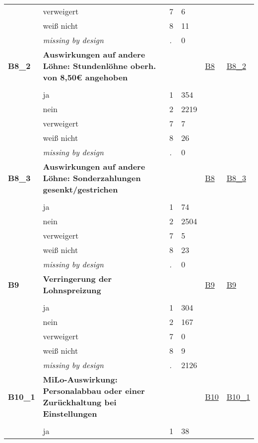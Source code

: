 \begin{longtable}{| L{2.45cm} | L{6cm} | C{1.5cm} | R{1cm} | C{2.25cm} | C{2.25cm} |}
   & verweigert & 7 & 6 &  &  \\ 
   & weiß nicht & 8 & 11 &  &  \\ 
   & \textit{missing by design} & \textit{.} & 0 &  &  \\ 
   \midrule
\textbf{B8\_2}\label{var:B8:2} & \textbf{Auswirkungen auf andere Löhne: Stundenlöhne oberh. von 8,50€ angehoben} &  &  & \hyperref[B8]{B8} & \hyperref[var:suf:B8:2]{B8\_2} \\ 
   &  &  &  &  &  \\ 
   & ja & 1 & 354 &  &  \\ 
   & nein & 2 & 2219 &  &  \\ 
   & verweigert & 7 & 7 &  &  \\ 
   & weiß nicht & 8 & 26 &  &  \\ 
   & \textit{missing by design} & \textit{.} & 0 &  &  \\ 
   \midrule
\textbf{B8\_3}\label{var:B8:3} & \textbf{Auswirkungen auf andere Löhne: Sonderzahlungen gesenkt/gestrichen} &  &  & \hyperref[B8]{B8} & \hyperref[var:suf:B8:3]{B8\_3} \\ 
   &  &  &  &  &  \\ 
   & ja & 1 & 74 &  &  \\ 
   & nein & 2 & 2504 &  &  \\ 
   & verweigert & 7 & 5 &  &  \\ 
   & weiß nicht & 8 & 23 &  &  \\ 
   & \textit{missing by design} & \textit{.} & 0 &  &  \\ 
   \midrule
\textbf{B9}\label{var:B9} & \textbf{Verringerung der Lohnspreizung} &  &  & \hyperref[B9]{B9} & \hyperref[var:suf:B9]{B9} \\ 
   &  &  &  &  &  \\ 
   & ja & 1 & 304 &  &  \\ 
   & nein & 2 & 167 &  &  \\ 
   & verweigert & 7 & 0 &  &  \\ 
   & weiß nicht & 8 & 9 &  &  \\ 
   & \textit{missing by design} & \textit{.} & 2126 &  &  \\ 
   \midrule
\textbf{B10\_1}\label{var:B10:1} & \textbf{MiLo-Auswirkung: Personalabbau oder einer Zurückhaltung bei Einstellungen} &  &  & \hyperref[B10]{B10} & \hyperref[var:suf:B10:1]{B10\_1} \\ 
   &  &  &  &  &  \\ 
   & ja & 1 & 38 &  &  \\ 

\end{longtable}
